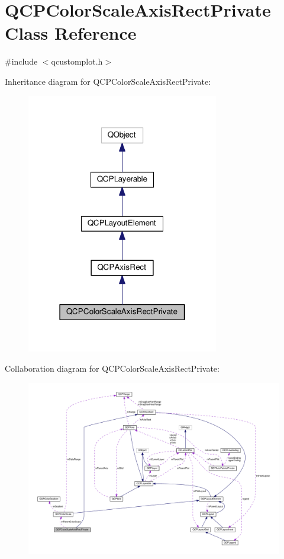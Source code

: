 \hypertarget{classQCPColorScaleAxisRectPrivate}{}\section{Q\+C\+P\+Color\+Scale\+Axis\+Rect\+Private Class Reference}
\label{classQCPColorScaleAxisRectPrivate}


{\ttfamily \#include $<$qcustomplot.\+h$>$}



Inheritance diagram for Q\+C\+P\+Color\+Scale\+Axis\+Rect\+Private\+:
\nopagebreak
\begin{figure}[H]
\begin{center}
\leavevmode
\includegraphics[width=238pt]{classQCPColorScaleAxisRectPrivate__inherit__graph}
\end{center}
\end{figure}


Collaboration diagram for Q\+C\+P\+Color\+Scale\+Axis\+Rect\+Private\+:
\nopagebreak
\begin{figure}[H]
\begin{center}
\leavevmode
\includegraphics[width=350pt]{classQCPColorScaleAxisRectPrivate__coll__graph}
\end{center}
\end{figure}
